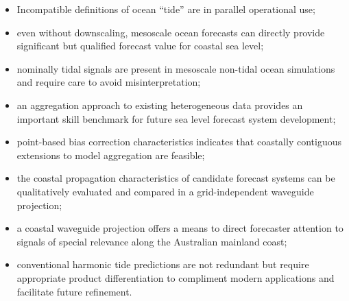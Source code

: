 
\begin{itemize}
    \item Incompatible definitions of ocean ``tide'' are in parallel operational use;
    \item even without downscaling, mesoscale ocean forecasts can directly provide significant but qualified forecast value for coastal sea level;
    \item nominally tidal signals are present in mesoscale non-tidal ocean simulations and require care to avoid misinterpretation; 
    \item an aggregation approach to existing heterogeneous data provides an important skill benchmark for future sea level forecast system development; 
    \item point-based bias correction characteristics indicates that coastally contiguous extensions to model aggregation are feasible;
    \item the coastal propagation characteristics of candidate forecast systems can be qualitatively evaluated and compared in a grid-independent waveguide projection; 
    \item a coastal waveguide projection offers a means to direct forecaster attention to signals of special relevance along the Australian mainland coast;
    \item conventional harmonic tide predictions are not redundant but require appropriate product differentiation to compliment modern applications and facilitate future refinement.
\end{itemize}